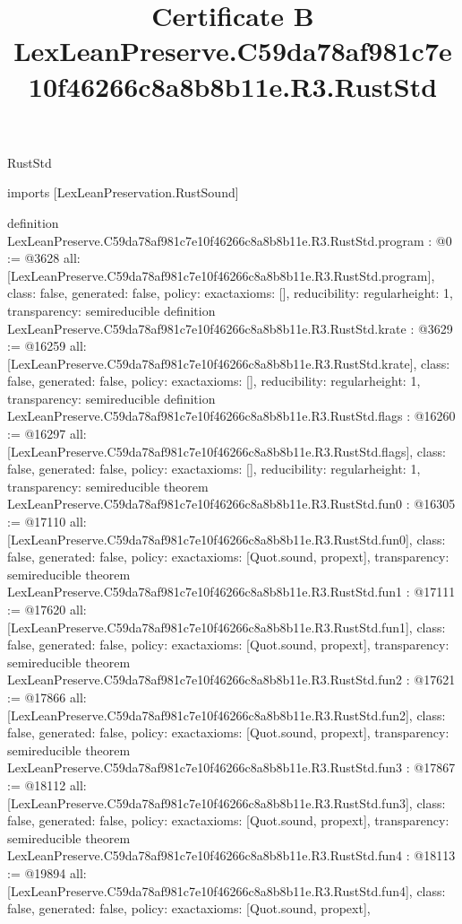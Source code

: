 \begin{lexlean}{RustStd}
\title{Certificate B LexLeanPreserve.C59da78af981c7e10f46266c8a8b8b11e.R3.RustStd}
\begin{coremodule}
imports [LexLeanPreservation.RustSound]

definition LexLeanPreserve.C59da78af981c7e10f46266c8a8b8b11e.R3.RustStd.program : @0 := @3628 {
  all: [LexLeanPreserve.C59da78af981c7e10f46266c8a8b8b11e.R3.RustStd.program],
  class: false,
  generated: false,
  policy: exact{axioms: []},
  reducibility: regular{height: 1},
  transparency: semireducible
}
definition LexLeanPreserve.C59da78af981c7e10f46266c8a8b8b11e.R3.RustStd.krate : @3629 := @16259 {
  all: [LexLeanPreserve.C59da78af981c7e10f46266c8a8b8b11e.R3.RustStd.krate],
  class: false,
  generated: false,
  policy: exact{axioms: []},
  reducibility: regular{height: 1},
  transparency: semireducible
}
definition LexLeanPreserve.C59da78af981c7e10f46266c8a8b8b11e.R3.RustStd.flags : @16260 := @16297 {
  all: [LexLeanPreserve.C59da78af981c7e10f46266c8a8b8b11e.R3.RustStd.flags],
  class: false,
  generated: false,
  policy: exact{axioms: []},
  reducibility: regular{height: 1},
  transparency: semireducible
}
theorem LexLeanPreserve.C59da78af981c7e10f46266c8a8b8b11e.R3.RustStd.fun0 : @16305 := @17110 {
  all: [LexLeanPreserve.C59da78af981c7e10f46266c8a8b8b11e.R3.RustStd.fun0],
  class: false,
  generated: false,
  policy: exact{axioms: [Quot.sound, propext]},
  transparency: semireducible
}
theorem LexLeanPreserve.C59da78af981c7e10f46266c8a8b8b11e.R3.RustStd.fun1 : @17111 := @17620 {
  all: [LexLeanPreserve.C59da78af981c7e10f46266c8a8b8b11e.R3.RustStd.fun1],
  class: false,
  generated: false,
  policy: exact{axioms: [Quot.sound, propext]},
  transparency: semireducible
}
theorem LexLeanPreserve.C59da78af981c7e10f46266c8a8b8b11e.R3.RustStd.fun2 : @17621 := @17866 {
  all: [LexLeanPreserve.C59da78af981c7e10f46266c8a8b8b11e.R3.RustStd.fun2],
  class: false,
  generated: false,
  policy: exact{axioms: [Quot.sound, propext]},
  transparency: semireducible
}
theorem LexLeanPreserve.C59da78af981c7e10f46266c8a8b8b11e.R3.RustStd.fun3 : @17867 := @18112 {
  all: [LexLeanPreserve.C59da78af981c7e10f46266c8a8b8b11e.R3.RustStd.fun3],
  class: false,
  generated: false,
  policy: exact{axioms: [Quot.sound, propext]},
  transparency: semireducible
}
theorem LexLeanPreserve.C59da78af981c7e10f46266c8a8b8b11e.R3.RustStd.fun4 : @18113 := @19894 {
  all: [LexLeanPreserve.C59da78af981c7e10f46266c8a8b8b11e.R3.RustStd.fun4],
  class: false,
  generated: false,
  policy: exact{axioms: [Quot.sound, propext]},
}
\end{coremodule}
\end{lexlean}
